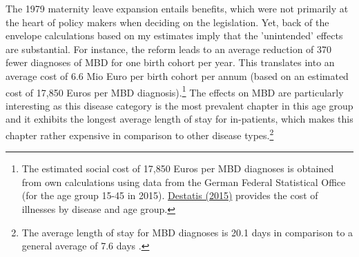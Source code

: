 \documentclass[11pt, a4paper,draft]{article} %
\begin{document}
The 1979 maternity leave expansion entails benefits, which were not primarily at the heart of policy makers when deciding on the legislation. Yet, back of the envelope calculations based on my estimates imply that the 'unintended' effects are substantial. For instance, the reform leads to an average reduction of 370 fewer diagnoses of MBD for one birth cohort per year. This translates into an average cost of 6.6 Mio Euro per birth cohort per annum (based on an estimated cost of 17,850 Euros per MBD diagnosis).\footnote{The estimated social cost of 17,850 Euros per MBD diagnoses is obtained from own calculations using data from the German Federal Statistical Office (for the age group 15-45 in 2015). \href{https://www.destatis.de/EN/Themes/Society-Environment/Health/Cost-Illness/Tables/disease-categories-age.html}{Destatis (2015)} provides the cost of illnesses by disease and age group.} The effects on MBD are particularly interesting as this disease category is the most prevalent chapter in this age group and it exhibits the longest average length of stay for in-patients, which makes this chapter rather expensive in comparison to other disease types.\footnote{The average length of stay for MBD diagnoses is 20.1 days  in comparison to a general average of 7.6 days \cite[p. 5]{statistisches2012diagnosedaten}.}\newline
\end{document}
